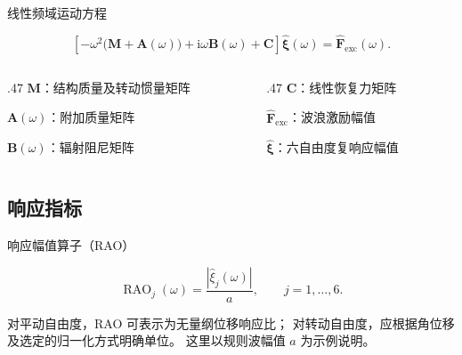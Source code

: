 \documentclass[UTF8,aspectratio=169]{beamer}
\begin{document}
\begin{frame}[t]{线性频域运动方程}

  \vspace{.25em}
  \begin{equation*}
  \left[
    -\omega^2\bigl(\mathbf{M}+\mathbf{A}(\omega)\bigr)
    +\mathrm{i}\omega\mathbf{B}(\omega)
    +\mathbf{C}
  \right]\hat{\boldsymbol{\xi}}(\omega)
  =\hat{\mathbf{F}}_{\mathrm{exc}}(\omega).
  \end{equation*}

  \vspace{.35em}
  \begin{columns}[T,onlytextwidth]
    \begin{column}{.47\textwidth}
      $\mathbf{M}$：结构质量及转动惯量矩阵\par\smallskip
      $\mathbf{A}(\omega)$：附加质量矩阵\par\smallskip
      $\mathbf{B}(\omega)$：辐射阻尼矩阵
    \end{column}
    \begin{column}{.47\textwidth}
      $\mathbf{C}$：线性恢复力矩阵\par\smallskip
      $\hat{\mathbf{F}}_{\mathrm{exc}}$：波浪激励幅值\par\smallskip
      $\hat{\boldsymbol{\xi}}$：六自由度复响应幅值
    \end{column}
  \end{columns}
\end{frame}

\subsection{响应指标}
\begin{frame}[t]{响应幅值算子（RAO）}

  \begin{equation*}
    \operatorname{RAO}_{j}(\omega)
       = \frac{\left|\hat{\xi}_{j}(\omega)\right|}{a},
       \qquad j=1,\ldots,6 .
  \end{equation*}

  \vspace{.6em}
  \begin{ResearchNote}
    对平动自由度，RAO 可表示为无量纲位移响应比；
    对转动自由度，应根据角位移及选定的归一化方式明确单位。
    这里以规则波幅值 $a$ 为示例说明。
  \end{ResearchNote}
\end{frame}
\end{document}
